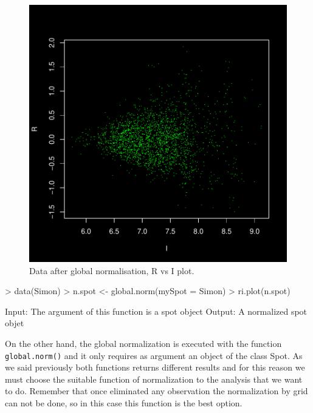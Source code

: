 \documentclass[12pt]{article}
\begin{document}
\begin{figure}[h]
\begin{center}
\includegraphics{example-genArise-011}
\caption{Data after global normalisation, R vs I plot. \label{fig9}}
\end{center}
\end{figure}
\begin{Scode}
> data(Simon)
> n.spot <- global.norm(mySpot = Simon)
> ri.plot(n.spot)
\end{Scode}
\begin{Soutput}
Input: The argument of this function is a spot object
Output: A normalized spot objet
\end{Soutput}



On the other hand, the global normalization is executed with the function \texttt{global.norm()} and it only requires as argument an object of the class Spot. As we said previously both functions returns different results and for this reason we must choose the suitable function of normalization to the analysis that we want to do. Remember that once eliminated any observation the normalization by grid can not be done, so in this case this function is the best option.
\end{document}
